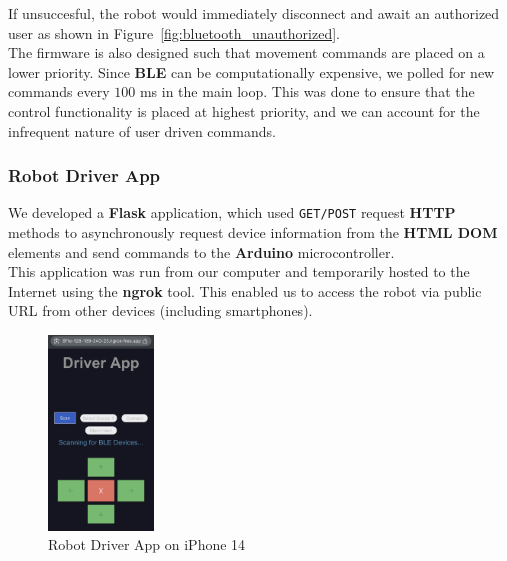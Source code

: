 \documentclass{article}
\begin{document}
\begin{minipage}{\linewidth}
    If unsuccesful, the robot would immediately disconnect and await an authorized user as shown in Figure~\ref{fig:bluetooth_unauthorized}. \\

    The firmware is also designed such that movement commands are placed on a lower priority. Since \textbf{BLE} can be computationally expensive,
    we polled for new commands every $100$ ms in the main loop. This was done to ensure that the control functionality is placed at highest priority,
    and we can account for the infrequent nature of user driven commands.
\end{minipage}

\subsubsection{Robot Driver App}

\begin{minipage}{\linewidth}
    We developed a \textbf{Flask} application, which used \texttt{GET/POST} request \textbf{HTTP} methods
    to asynchronously request device information from the \textbf{HTML DOM} elements and send commands to the
    \textbf{Arduino} microcontroller. \\

    This application was run from our computer and temporarily hosted to the Internet using the \textbf{ngrok} tool.
    This enabled us to access the robot via public URL from other devices (including smartphones).
\end{minipage}\vspace{0.5cm}

\begin{figure}[H]
    \centering
    \includegraphics[width=0.25\textwidth]{Figures/Robot_Driver_App.jpg}
    \caption{Robot Driver App on iPhone 14}
    \label{fig:ble_app}
\end{figure}
\end{document}
